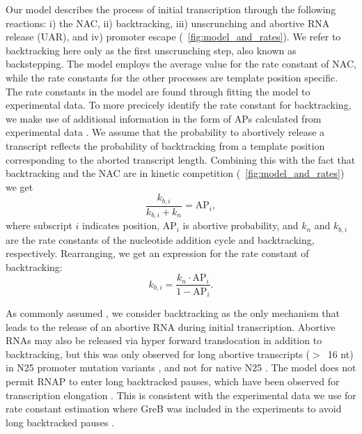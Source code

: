 %

Our model describes the process of initial transcription through the following
reactions: i) the NAC, ii) backtracking, iii) unscrunching and abortive RNA
release (UAR), and iv) promoter escape (\FIG~\ref{fig:model_and_rates}).  We
refer to backtracking here only as the first unscrunching step, also known as
backstepping. The model employs the average value for the rate constant of
NAC, while the rate constants for the other processes are template position
specific. The rate constants in the model are found through fitting the
model to experimental data. To more precicely identify the rate constant for
backtracking, we make use of additional information in the form of APs
calculated from experimental data \cite{hsu_quantitative_1996}. We assume that
the probability to abortively release a transcript reflects the probability of
backtracking from a template position corresponding to the aborted transcript
length. Combining this with the fact that backtracking and the NAC are in
kinetic competition (\FIG~\ref{fig:model_and_rates}) we get
\begin{equation*}
  \frac{k_{b,i}}{k_{b,i} + k_n} = \text{AP}_i,
\end{equation*}
where subscript $i$ indicates position, AP$_i$ is abortive probability, and
$k_n$ and $k_{b,i}$ are the rate constants of the nucleotide addition cycle
and backtracking, respectively. Rearranging, we get an expression for the
rate constant of backtracking:
\begin{equation}
  k_{b,i} = \frac{k_n\cdot\text{AP}_i}{1-\text{AP}_i}.
  \label{eq:backtrackingcalc}
\end{equation}

As commonly assumed \cite{xue_kinetic_2008,tang_real-time_2009}, we consider
backtracking as the only mechanism that leads to the release of an abortive
RNA during initial transcription. Abortive RNAs may also be released via hyper
forward translocation in addition to backtracking, but this was only observed
for long abortive transcripts ($>$~16 nt) in N25 promoter mutation variants
\cite{chander_alternate_2007, chander_mechanisms_2015}, and not for native N25
\cite{chander_alternate_2007}. The model does not permit RNAP to enter long
backtracked pauses, which have been observed for transcription elongation
\cite{shaevitz_backtracking_2003}. This is consistent with the experimental
data we use for rate constant estimation where GreB was included in the
experiments to avoid long backtracked pauses \cite{revyakin_abortive_2006}.

